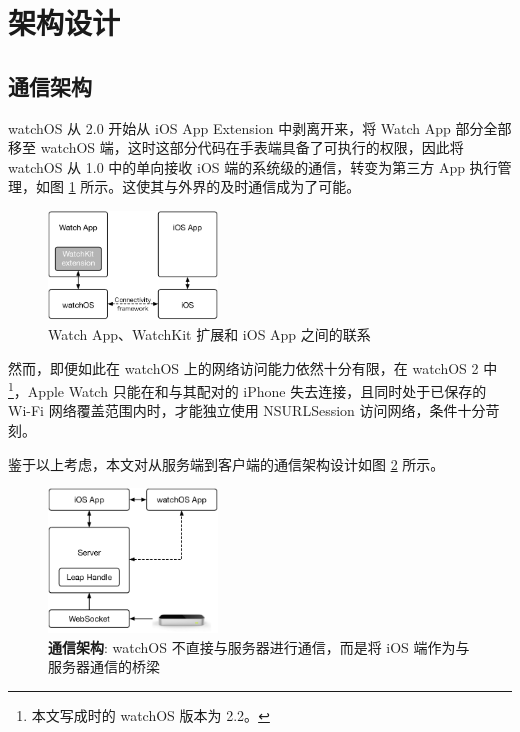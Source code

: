 \section{架构设计}
\label{sec:arch-design}

\subsection{通信架构}
\label{sub:im-arch}

watchOS 从 2.0 开始从 iOS App Extension 中剥离开来，将 Watch App 部分全部移至 watchOS 端，这时这部分代码在手表端具备了可执行的权限，因此将 watchOS 从 1.0 中的单向接收 iOS 端的系统级的通信，转变为第三方 App 执行管理\cite{WatchGuide:2016}，如图 \ref{fig:watch-phone} 所示。这使其与外界的及时通信成为了可能。

\begin{figure}[H]
    \centering
    \includegraphics[width=0.4\textwidth]{figures/watch-phone}
    \caption{\kaishu Watch App、WatchKit 扩展和 iOS App 之间的联系}
    \label{fig:watch-phone}
\end{figure}

然而，即便如此在 watchOS 上的网络访问能力依然十分有限，在 watchOS 2 中\footnote{本文写成时的 watchOS 版本为 2.2。}，Apple Watch 只能在和与其配对的 iPhone 失去连接，且同时处于已保存的 Wi-Fi 网络覆盖范围内时，才能独立使用 NSURLSession 访问网络，条件十分苛刻。

鉴于以上考虑，本文对从服务端到客户端的通信架构设计如图 \ref{fig:im-arch} 所示。

\begin{figure}[H]
    \centering
    \includegraphics[width=0.4\textwidth]{figures/arch}
    \caption{\kaishu \textbf{通信架构}: watchOS 不直接与服务器进行通信，而是将 iOS 端作为与服务器通信的桥梁}
    \label{fig:im-arch}
\end{figure}

